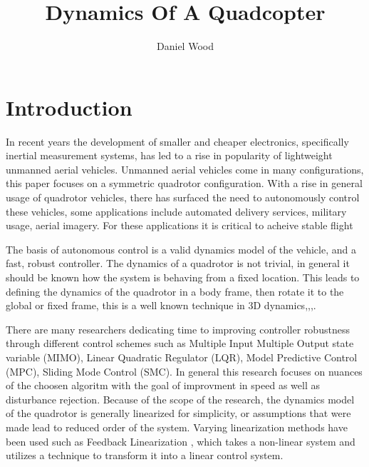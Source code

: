 \documentclass[9pt]{article}
\begin{document}
\title{Dynamics Of A Quadcopter}
\author{Daniel Wood}
\maketitle
\section{Introduction}

In recent years the development of smaller and cheaper electronics, specifically inertial measurement systems, has led to a rise in popularity of lightweight unmanned aerial vehicles. Unmanned aerial vehicles come in many configurations, this paper focuses on a symmetric quadrotor configuration. With a rise in general usage of quadrotor vehicles, there has surfaced the need to autonomously control these vehicles, some applications include automated delivery services, military usage, aerial imagery. For these applications it is critical to acheive stable flight

The basis of autonomous control is a valid dynamics model of the vehicle, and a fast, robust controller. The dynamics of a quadrotor is not trivial, in general it should be known how the system is behaving from a fixed location. This leads to defining the dynamics of the quadrotor in a body frame, then rotate it to the global or fixed frame, this is a well known technique in 3D dynamics\cite{FanniMohamed2017AN6Q},\cite{FarameeVeeravat2014EotS},\cite{HaomiaoHuang2009Aaco},\cite{DenisKotarski2016CDFU}.

There are many researchers dedicating time to improving controller robustness through different control schemes such as Multiple Input Multiple Output state variable (MIMO)\cite{FarameeVeeravat2014EotS}, Linear Quadratic Regulator (LQR), Model Predictive Control (MPC), Sliding Mode Control (SMC). In general this research focuses on nuances of the choosen algoritm with the goal of improvment in speed as well as disturbance rejection\cite{DenisKotarski2016CDFU}. Because of the scope of the research, the dynamics model of the quadrotor is generally linearized for simplicity, or assumptions that were made lead to reduced order of the system\cite{FarameeVeeravat2014EotS}. Varying linearization methods have been used such as Feedback Linearization \cite{KhalifaA2012Maco}, which takes a non-linear system and utilizes a technique to transform it into a linear control system.


\end{document}
